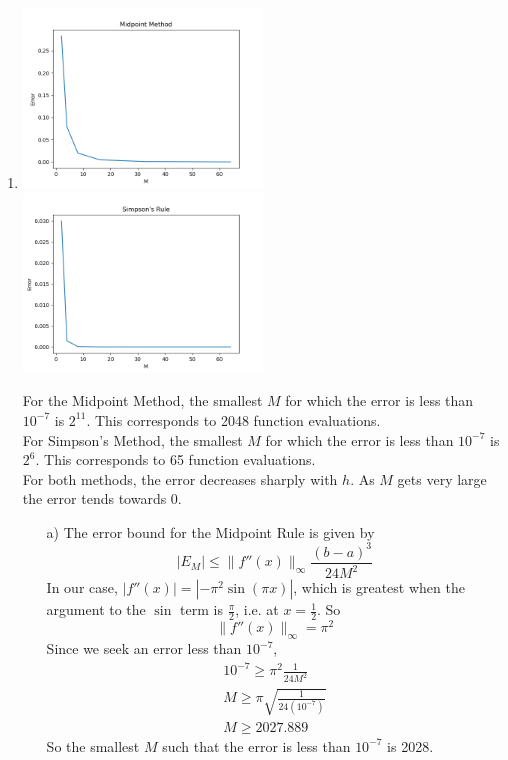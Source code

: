 \documentclass[letterpaper,12pt]{article} %
\begin{document}
\begin{enumerate}
  \item {
    \includegraphics[width=0.5\textwidth]{mperror}
    \includegraphics[width=0.5\textwidth]{sierror}

    For the Midpoint Method, the smallest \(M\) for which the error is less than \(10^{-7}\) is \(2^{11}\). This corresponds to 2048 function evaluations.\\
    For Simpson's Method, the smallest \(M\) for which the error is less than \(10^{-7}\) is \(2^{6}\). This corresponds to 65 function evaluations.\\

    For both methods, the error decreases sharply with \(h\). As \(M\) gets very large the error tends towards 0.

    \begin{enumerate}
      \newcommand{\norm}[1]{\lVert#1\rVert}
      \item[a)] {
        The error bound for the Midpoint Rule is given by\cite{errorbound}
        \[ |E_M| \leq \norm{f''(x)}_\infty \frac{(b-a)^3}{24M^2} \]
        In our case, \( |f''(x)| = |-\pi^2 \sin(\pi x)| \), which is greatest when the argument to the \(\sin\) term is \(\frac{\pi}{2}\), i.e. at \(x = \frac{1}{2}\). So
        \[ \norm{f''(x)}_\infty = \pi^2 \]
        Since we seek an error less than \(10^{-7}\),
        \begin{gather*}
          10^{-7} \geq \pi^2\frac{1}{24M^2} \\
          M \geq \pi\sqrt{\frac{1}{24(10^{-7})}} \\
          M \geq 2027.889
        \end{gather*}
        So the smallest \(M\) such that the error is less than \(10^{-7}\) is 2028.
      }
      

\end{enumerate}}
\end{enumerate}
\end{document}
